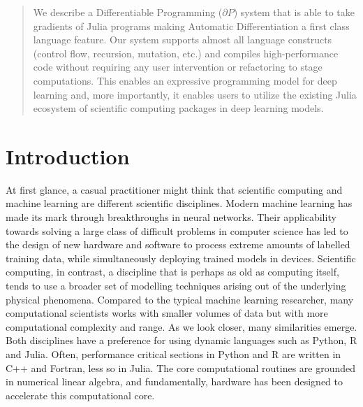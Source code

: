\documentclass{juliacon}
\begin{document}


\maketitle

\begin{abstract}
We describe a Differentiable Programming ($\partial P$) system that is able to take gradients of Julia programs making Automatic Differentiation a first class language feature. Our system supports almost all language constructs (control flow, recursion, mutation, etc.) and compiles high-performance code without requiring any user intervention or refactoring to stage computations. This enables an expressive programming model for deep learning and, more importantly, it enables users to utilize the existing Julia ecosystem of scientific computing packages in deep learning models.

\headingtable

\end{abstract}

\section{Introduction}

    At first glance, a casual practitioner might think that scientific computing and machine learning are different scientific disciplines. Modern machine learning has made its mark through breakthroughs in neural networks. Their applicability towards solving a large class of difficult problems in computer science has led to the design of new hardware and software to process extreme amounts of labelled training data, while simultaneously deploying trained models in devices. Scientific computing, in contrast, a discipline that is perhaps as old as computing itself, tends to use a broader set of modelling techniques arising out of the underlying physical phenomena. Compared to the typical machine learning researcher, many computational scientists works with smaller volumes of data but with more computational complexity and range. As we look closer, many similarities emerge. Both disciplines have a preference for using dynamic languages such as Python, R and Julia. Often, performance critical sections in Python and R are written in C++ and Fortran, less so in Julia. The core computational routines are grounded in numerical linear algebra, and fundamentally, hardware has been designed to accelerate this computational core. 
\end{document}
